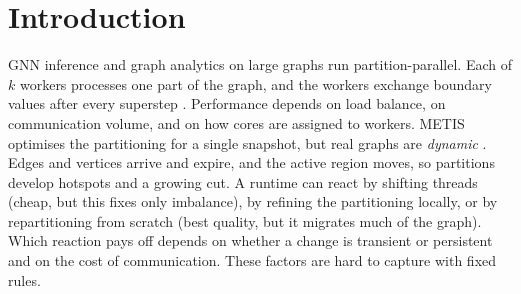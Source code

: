 \section{Introduction}

GNN inference and graph analytics on large graphs run partition-parallel. Each of $k$ workers
processes one part of the graph, and the workers exchange boundary values after every
superstep \cite{malewicz2010pregel}. Performance depends on load balance, on communication
volume, and on how cores are assigned to workers. METIS \cite{karypis1998metis} optimises the
partitioning for a single snapshot, but real graphs are \emph{dynamic}
\cite{dossantos2025landscape,zhang2026survey}. Edges and vertices arrive and expire, and the
active region moves, so partitions develop hotspots and a growing cut. A runtime can react by
shifting threads (cheap, but this fixes only imbalance), by refining the partitioning locally,
or by repartitioning from scratch (best quality, but it migrates much of the graph). Which
reaction pays off depends on whether a change is transient or persistent and on the cost of
communication. These factors are hard to capture with fixed rules.

